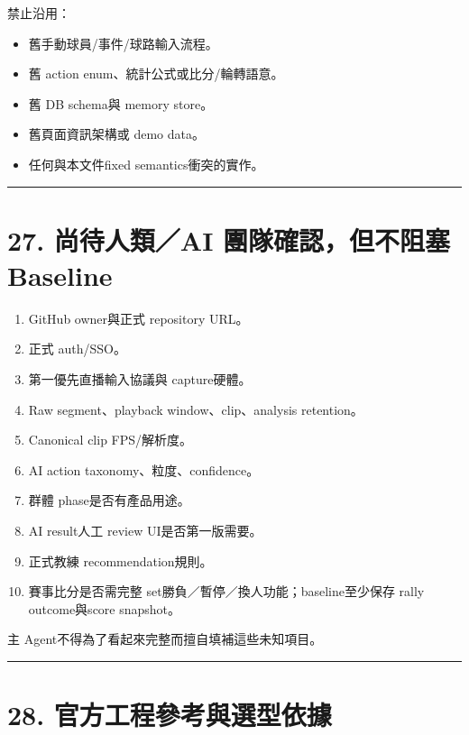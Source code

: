 \documentclass[
  9pt,
  a4paper,
]{article}
\providecommand{\tightlist}{%
  \setlength{\itemsep}{0pt}\setlength{\parskip}{0pt}}
\begin{document}
禁止沿用：

\begin{itemize}
\tightlist
\item
  舊手動球員/事件/球路輸入流程。
\item
  舊 action enum、統計公式或比分/輪轉語意。
\item
  舊 DB schema與 memory store。
\item
  舊頁面資訊架構或 demo data。
\item
  任何與本文件fixed semantics衝突的實作。
\end{itemize}

\begin{center}\rule{0.5\linewidth}{0.5pt}\end{center}

\section{27. 尚待人類／AI 團隊確認，但不阻塞
Baseline}\label{27-ux5c1aux5f85ux4ebaux985eai-ux5718ux968aux78baux8a8dux4f46ux4e0dux963bux585e-baseline}

\begin{enumerate}
\def\labelenumi{\arabic{enumi}.}
\tightlist
\item
  GitHub owner與正式 repository URL。
\item
  正式 auth/SSO。
\item
  第一優先直播輸入協議與 capture硬體。
\item
  Raw segment、playback window、clip、analysis retention。
\item
  Canonical clip FPS/解析度。
\item
  AI action taxonomy、粒度、confidence。
\item
  群體 phase是否有產品用途。
\item
  AI result人工 review UI是否第一版需要。
\item
  正式教練 recommendation規則。
\item
  賽事比分是否需完整 set勝負／暫停／換人功能；baseline至少保存 rally
  outcome與score snapshot。
\end{enumerate}

主 Agent不得為了看起來完整而擅自填補這些未知項目。

\begin{center}\rule{0.5\linewidth}{0.5pt}\end{center}

\section{28.
官方工程參考與選型依據}\label{28-ux5b98ux65b9ux5de5ux7a0bux53c3ux8003ux8207ux9078ux578bux4f9dux64da}
\end{document}
